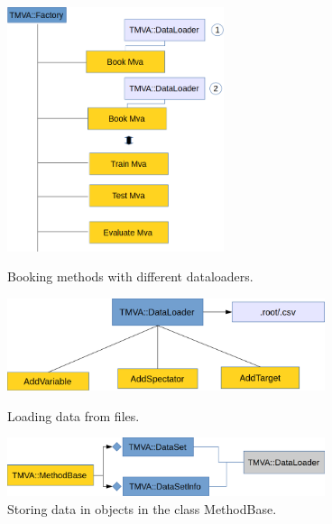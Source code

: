 \documentclass[a4paper]{jpconf}
\begin{document}
\begin{figure}[h]
\begin{minipage}{15pc}
\includegraphics[width=15pc]{img/dl1.png}
\caption{\label{dl1}Booking methods with different dataloaders.}
\end{minipage}\hspace{2pc}%
\begin{minipage}{15pc}
\includegraphics[width=22pc]{img/dl2.png}
\caption{\label{dl2}Loading data from files.}\vspace{4pc}%
\includegraphics[width=22pc]{img/dl3.png}
\caption{\label{dl3}Storing data in objects in the class MethodBase.}
\end{minipage} 
\end{figure}
\end{document}
